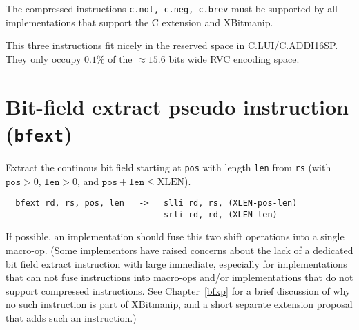 The compressed instructions \texttt{c.not,\ c.neg,\ c.brev} must be supported by
all implementations that support the C extension and XBitmanip.



This three instructions fit nicely in the reserved space in C.LUI/C.ADDI16SP.
They only occupy $0.1\%$ of the $\approx15.6$ bits wide RVC encoding space.


\section{Bit-field extract pseudo instruction ({\tt bfext})}

Extract the continous bit field starting at {\tt pos} with length {\tt len}
from {\tt rs} (with $\texttt{pos}>0$, $\texttt{len}>0$, and
$\texttt{pos}+\texttt{len}\le\textrm{XLEN}$).

\begin{verbatim}
  bfext rd, rs, pos, len   ->   slli rd, rs, (XLEN-pos-len)
                                srli rd, rd, (XLEN-len)
\end{verbatim}

If possible, an implementation should fuse this two shift operations into a single
macro-op. (Some implementors have raised concerns about the lack of a dedicated
bit field extract instruction with large immediate, especially for implementations
that can not fuse instructions into macro-ops and/or implementations that do
not support compressed instructions. See Chapter~\ref{bfxp} for a brief discussion
of why no such instruction is part of XBitmanip, and a short separate extension
proposal that adds such an instruction.)
